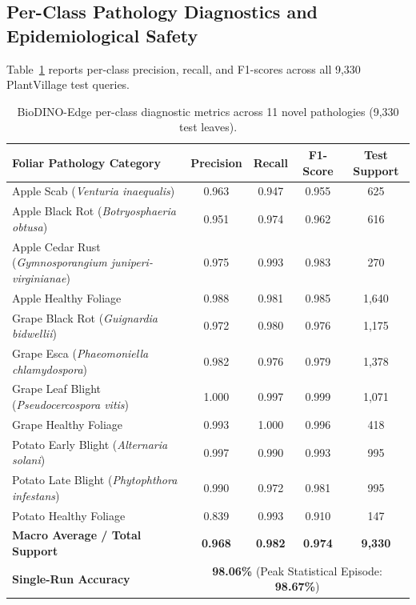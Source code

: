 \documentclass[preprint,12pt]{elsarticle}
\begin{document}
\subsection{Per-Class Pathology Diagnostics and Epidemiological Safety}
\label{sec:per_class}
Table~\ref{tab:per_class} reports per-class precision, recall, and F1-scores across all 9,330 PlantVillage test queries.

\begin{table}[htbp]
\caption{BioDINO-Edge per-class diagnostic metrics across 11 novel pathologies (9,330 test leaves).}
\label{tab:per_class}
\centering

\footnotesize
\setlength{\tabcolsep}{5pt}
\begin{tabularx}{\textwidth}{Xcccc}
\toprule
\textbf{Foliar Pathology Category} & \textbf{Precision} & \textbf{Recall} & \textbf{F1-Score} & \textbf{Test Support} \\
\midrule
Apple Scab (\textit{Venturia inaequalis}) & 0.963 & 0.947 & 0.955 & 625 \\
Apple Black Rot (\textit{Botryosphaeria obtusa}) & 0.951 & 0.974 & 0.962 & 616 \\
Apple Cedar Rust (\textit{Gymnosporangium juniperi-virginianae}) & 0.975 & 0.993 & 0.983 & 270 \\
Apple Healthy Foliage & 0.988 & 0.981 & 0.985 & 1,640 \\
\midrule
Grape Black Rot (\textit{Guignardia bidwellii}) & 0.972 & 0.980 & 0.976 & 1,175 \\
Grape Esca (\textit{Phaeomoniella chlamydospora}) & 0.982 & 0.976 & 0.979 & 1,378 \\
Grape Leaf Blight (\textit{Pseudocercospora vitis}) & 1.000 & 0.997 & 0.999 & 1,071 \\
Grape Healthy Foliage & 0.993 & 1.000 & 0.996 & 418 \\
\midrule
Potato Early Blight (\textit{Alternaria solani}) & 0.997 & 0.990 & 0.993 & 995 \\
Potato Late Blight (\textit{Phytophthora infestans}) & 0.990 & 0.972 & 0.981 & 995 \\
Potato Healthy Foliage & 0.839 & 0.993 & 0.910 & 147 \\
\midrule
\textbf{Macro Average / Total Support} & \textbf{0.968} & \textbf{0.982} & \textbf{0.974} & \textbf{9,330} \\
\textbf{Single-Run Accuracy} & \multicolumn{4}{c}{\textbf{98.06\%} (Peak Statistical Episode: \textbf{98.67\%})} \\
\bottomrule
\end{tabularx}
\end{table}
\end{document}
